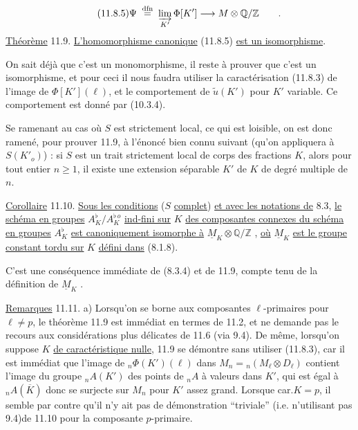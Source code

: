 \begin{equation}\tag{11.8.5}
\Psi \;\overset{\mathrm{dfn}}{=}\; \varinjlim_{K'} \Phi[K'] \longrightarrow M \otimes \mathbb{Q}/\mathbb{Z} \qquad .
\end{equation}
\underline{Théorème} 11.9. \underline{L'homomorphisme canonique} (11.8.5) \underline{est un isomorphisme}.

On sait déjà que c'est un monomorphisme, il reste à prouver que c'est un isomorphisme, et pour ceci il nous faudra utiliser la caractérisation (11.8.3) de l'image de $\Phi[K'](\ell)$, et le comportement de $\widetilde{u}(K')$ pour $K'$ variable. Ce comportement est donné par (10.3.4).



Se ramenant au cas où $S$ est strictement local, ce qui est loisible, on est donc ramené, pour prouver 11.9, à l'énoncé bien connu suivant (qu'on appliquera à $S(K'_o)$) : si $S$ est un trait strictement local de corps des fractions $K$, alors pour tout entier $n \geqslant 1$, il existe une extension séparable $K'$ de $K$ de degré multiple de $n$.

\underline{Corollaire} 11.10. \underline{Sous les conditions} ($S$ \underline{complet}) \underline{et avec les notations de} 8.3, \underline{le schéma en groupes} $A^{\flat}_K/A^{\flat\,o}_K$ \underline{ind-fini sur} $K$ \underline{des composantes connexes du schéma en groupes} $A^{\flat}_K$ \underline{est canoniquement isomorphe à} $\underline{M}_K \otimes \mathbb{Q}/\mathbb{Z}$ , \underline{où} $\underline{M}_K$ \underline{est le groupe constant tordu sur} $K$ \underline{défini dans} (8.1.8).

C'est une conséquence immédiate de (8.3.4) et de 11.9, compte tenu de la définition de $\underline{M}_K$ .

\underline{Remarques} 11.11.  a) Lorsqu'on se borne aux composantes $\ell$-primaires pour $\ell \neq p$, le théorème 11.9 est immédiat en termes de 11.2, et ne demande pas le recours aux considérations plus délicates de 11.6 (via 9.4). De même, lorsqu'on suppose $K$ \underline{de caractéristique nulle}, 11.9 se démontre sans utiliser (11.8.3), car il est immédiat que l'image de ${}_n\Phi(K')(\ell)$ dans $M_n = {}_n(M_\ell \otimes D_\ell)$ contient l'image du groupe ${}_nA(K')$ des points de ${}_nA$ à valeurs dans $K'$, qui est égal à ${}_nA(\overline{K})$ donc se surjecte sur $M_n$ pour $K'$ assez grand. Lorsque car.$K = p$, il semble par contre qu'il n'y ait pas de démonstration ``triviale'' (i.e. n'utilisant pas 9.4)de 11.10 pour la composante $p$-primaire.

